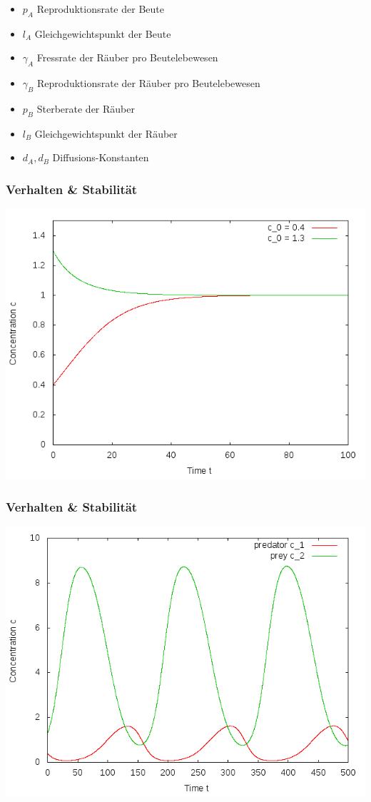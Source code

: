 \documentclass[12pt]{beamer}
\begin{document}
\begin{frame}
\begin{tabular}{ r c c c }
      \end{tabular}
      \renewcommand{\arraystretch}{1.0}
      \begin{itemize}
	  \item $p_A$ Reproduktionsrate der Beute
	  \item $l_A$ Gleichgewichtspunkt der Beute
	  \item $\gamma_A$ Fressrate der Räuber pro Beutelebewesen
	  \item $\gamma_B$ Reproduktionsrate der Räuber pro Beutelebewesen
	  \item $p_B$ Sterberate der Räuber
	  \item $l_B$ Gleichgewichtspunkt der Räuber
	  \item $d_A, d_B$ Diffusions-Konstanten
      \end{itemize}
    \end{frame}
    
    \begin{frame}
    \frametitle{Verhalten \& Stabilität}
    \includegraphics[scale=0.5]{Bilder/n1_anfangsbedingungen.png}
    \end{frame}
    
    \begin{frame}
    \frametitle{Verhalten \& Stabilität}
    \includegraphics[scale=0.5]{Bilder/n2_unged_schwingungen.png}
    \end{frame}
    
\end{document}
